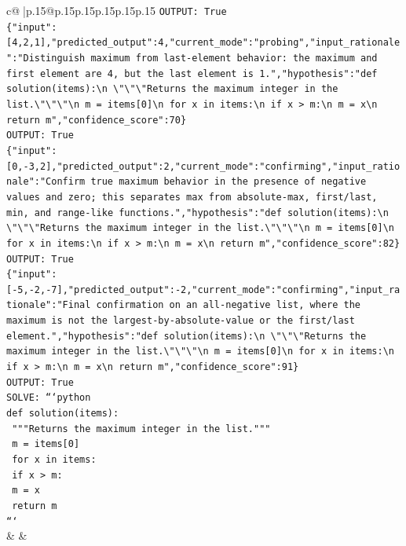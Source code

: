 \documentclass{article}
\begin{document}
{\begin{supertabular}{c@{$\;$}|p{.15\linewidth}@{}p{.15\linewidth}p{.15\linewidth}p{.15\linewidth}p{.15\linewidth}p{.15\linewidth}}
{{{\texttt{OUTPUT: True} \\
\texttt{\{"input":{[}4,2,1{]},"predicted\_output":4,"current\_mode":"probing","input\_rationale":"Distinguish maximum from last{-}element behavior: the maximum and first element are 4, but the last element is 1.","hypothesis":"def solution(items):\textbackslash{}n    \textbackslash{}"\textbackslash{}"\textbackslash{}"Returns the maximum integer in the list.\textbackslash{}"\textbackslash{}"\textbackslash{}"\textbackslash{}n    m = items{[}0{]}\textbackslash{}n    for x in items:\textbackslash{}n        if x > m:\textbackslash{}n            m = x\textbackslash{}n    return m","confidence\_score":70\}} \\
\texttt{OUTPUT: True} \\
\texttt{\{"input":{[}0,{-}3,2{]},"predicted\_output":2,"current\_mode":"confirming","input\_rationale":"Confirm true maximum behavior in the presence of negative values and zero; this separates max from absolute{-}max, first/last, min, and range{-}like functions.","hypothesis":"def solution(items):\textbackslash{}n    \textbackslash{}"\textbackslash{}"\textbackslash{}"Returns the maximum integer in the list.\textbackslash{}"\textbackslash{}"\textbackslash{}"\textbackslash{}n    m = items{[}0{]}\textbackslash{}n    for x in items:\textbackslash{}n        if x > m:\textbackslash{}n            m = x\textbackslash{}n    return m","confidence\_score":82\}} \\
\texttt{OUTPUT: True} \\
\texttt{\{"input":{[}{-}5,{-}2,{-}7{]},"predicted\_output":{-}2,"current\_mode":"confirming","input\_rationale":"Final confirmation on an all{-}negative list, where the maximum is not the largest{-}by{-}absolute{-}value or the first/last element.","hypothesis":"def solution(items):\textbackslash{}n    \textbackslash{}"\textbackslash{}"\textbackslash{}"Returns the maximum integer in the list.\textbackslash{}"\textbackslash{}"\textbackslash{}"\textbackslash{}n    m = items{[}0{]}\textbackslash{}n    for x in items:\textbackslash{}n        if x > m:\textbackslash{}n            m = x\textbackslash{}n    return m","confidence\_score":91\}} \\
\texttt{OUTPUT: True} \\
\texttt{SOLVE: ```python} \\
\texttt{def solution(items):} \\
\texttt{    """Returns the maximum integer in the list."""} \\
\texttt{    m = items{[}0{]}} \\
\texttt{    for x in items:} \\
\texttt{        if x > m:} \\
\texttt{            m = x} \\
\texttt{    return m} \\
\texttt{```} \\
            }
        }
    }
    & & \\ \\


\end{supertabular}}
\end{document}
